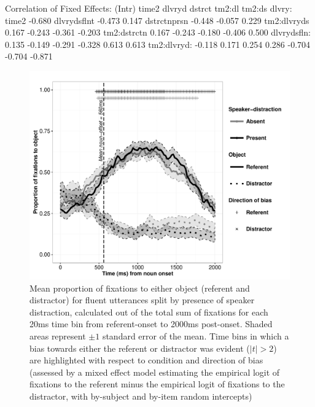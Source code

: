 \documentclass[a4paper,man,natbib]{apa6}
\begin{document}
Correlation of Fixed Effects:
            (Intr) time2  dlvryd dstrct tm2:dl tm2:ds dlvry:
time2       -0.680                                          
dlvrydsflnt -0.473  0.147                                   
dstrctnprsn -0.448 -0.057  0.229                            
tm2:dlvryds  0.167 -0.243 -0.361 -0.203                     
tm2:dstrctn  0.167 -0.243 -0.180 -0.406  0.500              
dlvrydsfln:  0.135 -0.149 -0.291 -0.328  0.613  0.613       
tm2:dlvryd: -0.118  0.171  0.254  0.286 -0.704 -0.704 -0.871
\fi


\begin{figure}[Ht]
  \centering
	\includegraphics[width=\linewidth]{eye_fl.pdf}
  \caption{Mean proportion of fixations to either object (referent and distractor) for fluent utterances split by presence of speaker distraction, calculated out of the total sum of fixations for each 20ms time bin from referent-onset to 2000ms post-onset. Shaded areas represent $\pm 1$ standard error of the mean. Time bins in which a bias towards either the referent or distractor was evident ($|t|>2$) are highlighted with respect to condition and direction of bias (assessed by a mixed effect model estimating the empirical logit of fixations to the referent minus the empirical logit of fixations to the distractor, with by-subject and by-item random intercepts)}
  \label{fig:flueye}
\end{figure}
\end{document}
